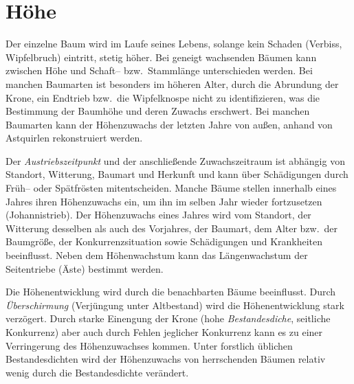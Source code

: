 \documentclass[twocolumn]{scrartcl}
\begin{document}
\section{Höhe}

Der einzelne Baum wird im Laufe seines Lebens, solange kein Schaden (Verbiss,
Wipfelbruch) eintritt, stetig höher. Bei geneigt wachsenden Bäumen kann zwischen
Höhe und Schaft-- bzw.\ Stammlänge unterschieden werden. Bei manchen Baumarten
ist besonders im höheren Alter, durch die Abrundung der Krone, ein Endtrieb
bzw.\ die Wipfelknospe nicht zu identifizieren, was die Bestimmung der Baumhöhe
und deren Zuwachs erschwert. Bei manchen Baumarten kann der Höhenzuwachs der
letzten Jahre von außen, anhand von Astquirlen rekonstruiert werden.

Der \emph{Austriebszeitpunkt} und der anschließende Zuwachszeitraum ist abhängig
von Standort, Witterung, Baumart und Herkunft und kann über Schädigungen durch
Früh-- oder Spätfrösten mitentscheiden. Manche Bäume stellen innerhalb eines
Jahres ihren Höhenzuwachs ein, um ihn im selben Jahr wieder fortzusetzen
(Johannistrieb). Der Höhenzuwachs eines Jahres wird vom Standort, der Witterung
desselben als auch des Vorjahres, der Baumart, dem Alter bzw.\ der Baumgröße,
der Konkurrenzsituation sowie Schädigungen und Krankheiten beeinflusst. Neben
dem Höhenwachstum kann das Längenwachstum der Seitentriebe (Äste) bestimmt
werden.

Die Höhenentwicklung wird durch die benachbarten Bäume beeinflusst. Durch
\emph{Überschirmung} (Verjüngung unter Altbestand) wird die Höhenentwicklung
stark verzögert. Durch starke Einengung der Krone (hohe \emph{Bestandesdiche},
seitliche Konkurrenz) aber auch durch Fehlen jeglicher Konkurrenz kann es zu
einer Verringerung des Höhenzuwachses kommen. Unter forstlich üblichen
Bestandesdichten wird der Höhenzuwachs von herrschenden Bäumen relativ wenig
durch die Bestandesdichte verändert.
\end{document}
